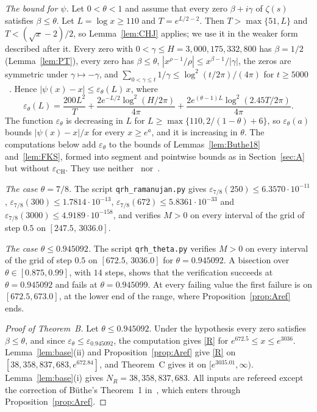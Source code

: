\documentclass{amsart}
\theoremstyle{definition}
\theoremstyle{remark}
\theoremstyle{plain}
\numberwithin{equation}{section}
\newcommand{\eps}{\varepsilon}
\newcommand{\NN}{38{,}358{,}837{,}683}
\newcommand{\HRH}{3{,}000{,}175{,}332{,}800}
\newcommand{\epsCH}{\eps_{\mathrm{CH}}}
\newcommand{\thetaB}{0.945092}
\begin{document}
\emph{The bound for $\psi$.} Let $0<\theta<1$ and assume that every zero $\beta+i\gamma$ of $\zeta(s)$ satisfies $\beta\le\theta$. Let $L=\log x\ge110$ and $T=e^{L/2-2}$. Then $T>\max\{51,L\}$ and $T<(\sqrt x-2)/2$, so Lemma~\ref{lem:CHJ} applies; we use it in the weaker form described after it. Every zero with $0<\gamma\le H=\HRH$ has $\beta=1/2$ (Lemma~\ref{lem:PT}), every zero has $\beta\le\theta$, $|x^{\rho-1}/\rho|\le x^{\beta-1}/|\gamma|$, the zeros are symmetric under $\gamma\mapsto-\gamma$, and $\sum_{0<\gamma\le t}1/\gamma\le\log^2(t/2\pi)/(4\pi)$ for $t\ge5000$~\cite[Lemma~3]{But16}. Hence $|\psi(x)-x|\le\eps_\theta(L)\,x$, where
\[
\eps_\theta(L)=\frac{200L^2}{T}+\frac{2e^{-L/2}\log^2(H/2\pi)}{4\pi}+\frac{2e^{(\theta-1)L}\log^2(2.45T/2\pi)}{4\pi}.
\]
The function $\eps_\theta$ is decreasing in $L$ for $L\ge\max\{110,2/(1-\theta)+6\}$, so $\eps_\theta(a)$ bounds $|\psi(x)-x|/x$ for every $x\ge e^a$, and it is increasing in $\theta$. The computations below add $\eps_\theta$ to the bounds of Lemmas~\ref{lem:Buthe18} and~\ref{lem:FKS}, formed into segment and pointwise bounds as in Section~\ref{sec:A} but without $\epsCH$. They use neither~\cite{CH25} nor~\cite{FJ26}.

\emph{The case $\theta=7/8$.} The script \texttt{qrh\_ramanujan.py} gives $\eps_{7/8}(250)\le6.3570\cdot10^{-11}$, $\eps_{7/8}(300)\le1.7814\cdot10^{-13}$, $\eps_{7/8}(672)\le5.8361\cdot10^{-33}$ and $\eps_{7/8}(3000)\le4.9189\cdot10^{-158}$, and verifies $M>0$ on every interval of the grid of step $0.5$ on $[247.5,\,3036.0]$.

\emph{The case $\theta\le\thetaB$.} The script \texttt{qrh\_theta.py} verifies $M>0$ on every interval of the grid of step $0.5$ on $[672.5,\,3036.0]$ for $\theta=\thetaB$. A bisection over $\theta\in[0.875,0.99]$, with $14$ steps, shows that the verification succeeds at $\theta=\thetaB$ and fails at $\theta=0.945099$. At every failing value the first failure is on $[672.5,673.0]$, at the lower end of the range, where Proposition~\ref{prop:Aref} ends.

\begin{proof}[Proof of Theorem~B]
Let $\theta\le\thetaB$. Under the hypothesis every zero satisfies $\beta\le\theta$, and since $\eps_\theta\le\eps_{\thetaB}$, the computation gives \eqref{R} for $e^{672.5}\le x\le e^{3036}$. Lemma~\ref{lem:base}(ii) and Proposition~\ref{prop:Aref} give \eqref{R} on $[\NN,\allowbreak e^{672.84}]$, and Theorem~C gives it on $[e^{3035.01},\allowbreak\infty)$. Lemma~\ref{lem:base}(i) gives $N_R=\NN$. All inputs are refereed except the correction of B\"uthe's Theorem~1 in~\cite{Bha24}, which enters through Proposition~\ref{prop:Aref}.
\end{proof}
\end{document}
